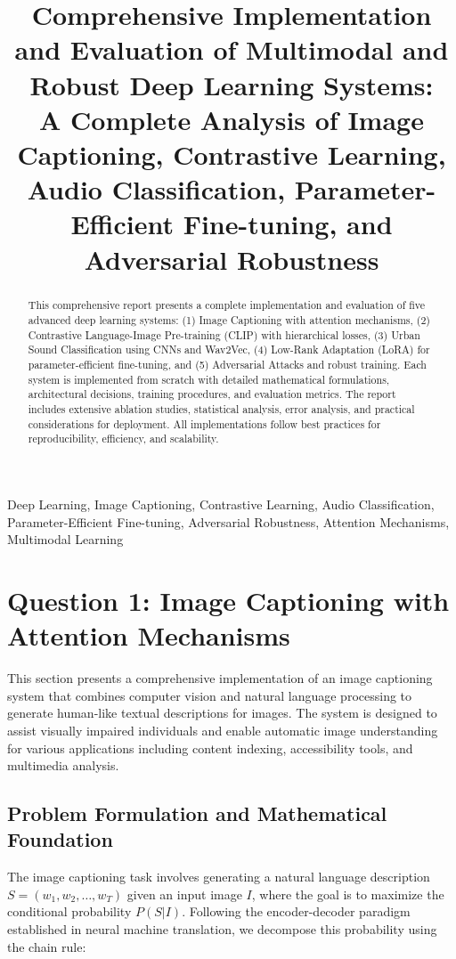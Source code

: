 \documentclass[conference]{IEEEtran}
\title{Comprehensive Implementation and Evaluation of Multimodal and Robust Deep Learning Systems: \\ A Complete Analysis of Image Captioning, Contrastive Learning, Audio Classification, Parameter-Efficient Fine-tuning, and Adversarial Robustness}
\author{\IEEEauthorblockN{Babak Mohtasham, Ranjbar, Hosseini, Javad, Mohammad Ghaderi, Yousef}
\IEEEauthorblockA{Faculty of Electrical \& Computer Engineering, University of Tehran\\
\texttt{(team email placeholder)}}}
\begin{document}
\maketitle

\begin{abstract}
This comprehensive report presents a complete implementation and evaluation of five advanced deep learning systems: (1) Image Captioning with attention mechanisms, (2) Contrastive Language-Image Pre-training (CLIP) with hierarchical losses, (3) Urban Sound Classification using CNNs and Wav2Vec, (4) Low-Rank Adaptation (LoRA) for parameter-efficient fine-tuning, and (5) Adversarial Attacks and robust training. Each system is implemented from scratch with detailed mathematical formulations, architectural decisions, training procedures, and evaluation metrics. The report includes extensive ablation studies, statistical analysis, error analysis, and practical considerations for deployment. All implementations follow best practices for reproducibility, efficiency, and scalability.
\end{abstract}

\begin{IEEEkeywords}
Deep Learning, Image Captioning, Contrastive Learning, Audio Classification, Parameter-Efficient Fine-tuning, Adversarial Robustness, Attention Mechanisms, Multimodal Learning
\end{IEEEkeywords}

\section{Question 1: Image Captioning with Attention Mechanisms}
\label{sec:q1}

This section presents a comprehensive implementation of an image captioning system that combines computer vision and natural language processing to generate human-like textual descriptions for images. The system is designed to assist visually impaired individuals and enable automatic image understanding for various applications including content indexing, accessibility tools, and multimedia analysis.

\subsection{Problem Formulation and Mathematical Foundation}
\label{sec:q1_problem}

The image captioning task involves generating a natural language description $S = (w_1, w_2, \dots, w_T)$ given an input image $I$, where the goal is to maximize the conditional probability $P(S|I)$. Following the encoder-decoder paradigm established in neural machine translation, we decompose this probability using the chain rule:
\end{document}
